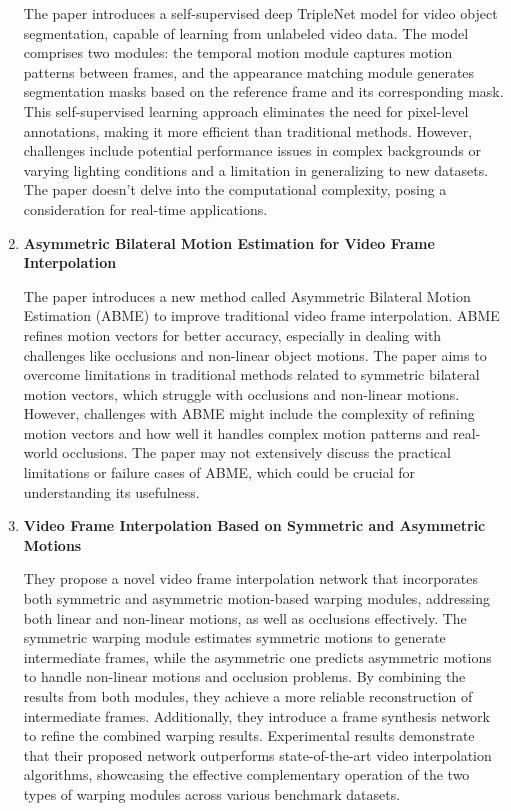 \begin{enumerate}
The paper introduces a self-supervised deep TripleNet model for video object segmentation, capable of learning from unlabeled video data. The model comprises two modules: the temporal motion module captures motion patterns between frames, and the appearance matching module generates segmentation masks based on the reference frame and its corresponding mask. This self-supervised learning approach eliminates the need for pixel-level annotations, making it more efficient than traditional methods. However, challenges include potential performance issues in complex backgrounds or varying lighting conditions and a limitation in generalizing to new datasets. The paper doesn't delve into the computational complexity, posing a consideration for real-time applications.


\item \textbf{Asymmetric Bilateral Motion Estimation for Video Frame Interpolation}\cite{7}

The paper introduces a new method called Asymmetric Bilateral Motion Estimation (ABME) to improve traditional video frame interpolation. ABME refines motion vectors for better accuracy, especially in dealing with challenges like occlusions and non-linear object motions. The paper aims to overcome limitations in traditional methods related to symmetric bilateral motion vectors, which struggle with occlusions and non-linear motions. However, challenges with ABME might include the complexity of refining motion vectors and how well it handles complex motion patterns and real-world occlusions. The paper may not extensively discuss the practical limitations or failure cases of ABME, which could be crucial for understanding its usefulness.

 
\item \textbf{Video Frame Interpolation Based on Symmetric and Asymmetric Motions}\cite{8}

They propose a novel video frame interpolation network that incorporates both symmetric and asymmetric motion-based warping modules, addressing both linear and non-linear motions, as well as occlusions effectively. The symmetric warping module estimates symmetric motions to generate intermediate frames, while the asymmetric one predicts asymmetric motions to handle non-linear motions and occlusion problems. By combining the results from both modules, they achieve a more reliable reconstruction of intermediate frames. Additionally, they introduce a frame synthesis network to refine the combined warping results. Experimental results demonstrate that their proposed network outperforms state-of-the-art video interpolation algorithms, showcasing the effective complementary operation of the two types of warping modules across various benchmark datasets.


\end{enumerate}
